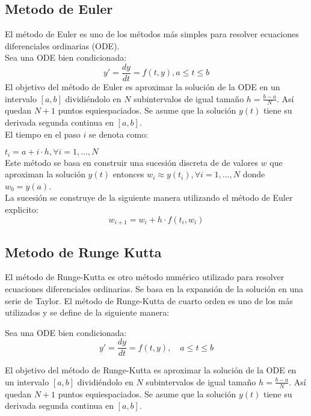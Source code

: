 \documentclass[12pt,a4]{article} %
\begin{document}
\begin{multicols}{2}
\subsection{Metodo de Euler}
 El método de Euler es uno de los métodos más simples para resolver ecuaciones diferenciales ordinarias (ODE).\\
 Sea una ODE bien condicionada:
    \begin{equation}
        y' = \frac{dy}{dt} = f(t,y),  a \leq t \leq b
    \end{equation}
 El objetivo del método de Euler es aproximar la solución de la ODE en un intervalo $[a,b]$ dividiéndolo en $N$ subintervalos de igual tamaño $h = \frac{b-a}{N}$. Así quedan $N + 1$ puntos equiespaciados. Se asume que la solución $y(t)$ tiene su derivada segunda continua en $[a,b]$.\\ 
 El tiempo en el paso $i$ se denota como:
    
        $t_i = a + i \cdot h, \forall i = 1, ..., N$\\
 Este método se basa en construir una sucesión discreta de de valores ${w}$ que aproximan la solución $y(t)$ entonces $ w_i \approx y(t_i), \forall i = 1, ..., N$ donde $w_0 = y(a)$.\\
La sucesión se construye de la siguiente manera utilizando el método de Euler explicito:
    \begin{equation}
        w_{i+1} = w_i + h \cdot f(t_i, w_i)
    \end{equation}

\subsection{Metodo de Runge Kutta}
El método de Runge-Kutta es otro método numérico utilizado para resolver ecuaciones diferenciales ordinarias. Se basa en la expansión de la solución en una serie de Taylor. El método de Runge-Kutta de cuarto orden es uno de los más utilizados y se define de la siguiente manera:

Sea una ODE bien condicionada:
\begin{equation}
    y' = \frac{dy}{dt} = f(t,y), \quad a \leq t \leq b
\end{equation}


El objetivo del método de Runge-Kutta es aproximar la solución de la ODE en un intervalo $[a,b]$ dividiéndolo en $N$ subintervalos de igual tamaño $h = \frac{b-a}{N}$. Así quedan $N + 1$ puntos equiespaciados. Se asume que la solución $y(t)$ tiene su derivada segunda continua en $[a,b]$.




\end{multicols}
\end{document}

